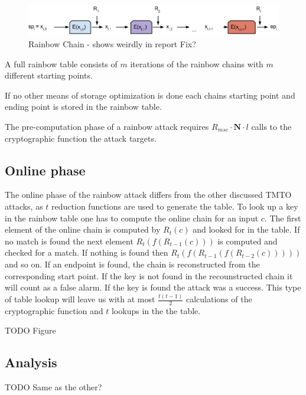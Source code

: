 \begin{figure}[H]
  \centering
  \includegraphics[scale=0.4]{figures/rainbowchain.png}
  \caption{Rainbow Chain - shows weirdly in report Fix?}
  \label{fig:rainbowchain}
\end{figure}

A full rainbow table consists of $m$ iterations of the rainbow chains
with $m$ different starting points.

If no other means of storage optimization is done each chains
starting point and ending point is stored in the rainbow table.

The pre-computation phase of a rainbow attack requires
$R_{msc} \cdot \textbf{N} \cdot l$ calls to the cryptographic function the attack targets.

\subsection{Online phase}
\label{sec:onlinerb}

The online phase of the rainbow attack differs from the other
discussed TMTO attacks, as $t$ reduction functions are used to
generate the table. To look up a key in the rainbow table one has to
compute the online chain for an input $c$. The first element of
the online chain is computed by $R_t(c)$ and looked for in the
table. If no match is found the next element $R_t(f(R_{t-1}(c)))$ is
computed and checked for a match. If nothing is found then $R_t(f(R_{t-1}(f(R_{t-2}(c)))))$
and so on. If an endpoint is found, the chain is reconstructed from the corresponding start
point. If the key is not found in the recounstructed chain it will count
as a false alarm. If the key is found the attack was a
success. This type of table lookup will leave us with at most
$\frac{t(t - 1)}{2}$ calculations of the cryptographic function and
$t$ lookups in the the table.

TODO Figure

\subsection{Analysis}

TODO Same as the other?



